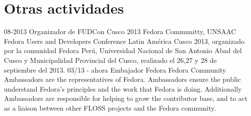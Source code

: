 \documentclass[]{friggeri-cv}
\begin{document}
\section{Otras actividades}
\begin{entrylist}
    \entry
    {08-2013}
    {Organizador de FUDCon Cusco 2013}
    {Fedora Communitty, UNSAAC}
    {Fedora Users and Developers Conference Latin América Cusco 2013, organizado
    por la comunidad Fedora Perú, Universidad Nacional de San Antonio Abad del
    Cusco y Municipalidad Provincial del Cusco, realizado el 26,27 y 28 de
    septiembre del 2013.}
    \entry
    {03/13 - ahora}
    {Embajador Fedora}
    {Fedora Community}
    {Ambassadors are the representatives of Fedora. Ambassadors ensure the public
    understand Fedora's principles and the work that Fedora is doing. Additionally
    Ambassadors are responsible for helping to grow the contributor base, and to
    act as a liaison between other FLOSS projects and the Fedora community. }
\end{entrylist}
%
\end{document}
